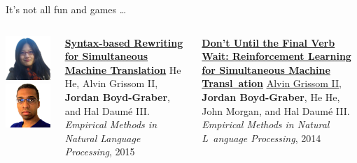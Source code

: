 \documentclass[compress]{beamer}
\begin{document}
\begin{frame}{It's not all fun and games \dots}

  \begin{columns}
    \begin{center}
        \includegraphics[width=0.7\linewidth]{general_figures/hehe} \\
        \includegraphics[width=0.7\linewidth]{general_figures/alvin}
      \end{center}
        \begin{block}{ {\bf \href{http://cs.colorado.edu/~jbg/docs/2015_emnlp_rewrite.pdf}{Syntax-based Rewriting for Simultaneous Machine Translation}}}
He He, Alvin Grissom II, {\bf Jordan Boyd-Graber}, and Hal {Daum\'{e} III}.  \emph{Empirical Methods in Natural Language Processing}, 2015
        \end{block}

\begin{block}{ {\bf \href{http://cs.colorado.edu/~jbg/docs/2014_emnlp_simtrans.pdf}{Don't Until the Final Verb Wait: Reinforcement Learning for Simultaneous Machine Transl\
ation}}}
\underline{\href{http://www.umiacs.umd.edu/~alvin/}{Alvin Grissom II}}, {\bf Jordan Boyd-Graber}, He He, John Morgan, and Hal {Daum\'{e} III}.  \emph{Empirical Methods in Natural L\
anguage Processing}, 2014
        \end{block}
  \end{columns}
\end{frame}
\end{document}
